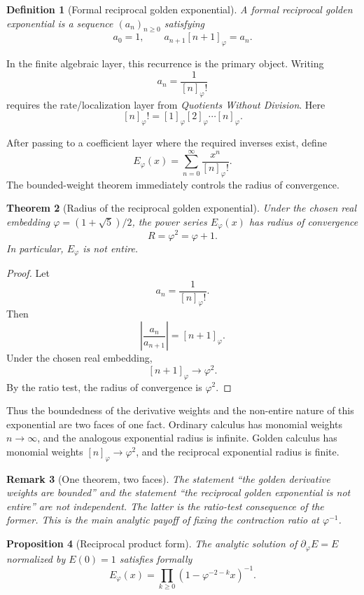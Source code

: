 \documentclass[11pt]{article}
\newtheorem{definition}{Definition}[section]
\newtheorem{theorem}[definition]{Theorem}
\newtheorem{proposition}[definition]{Proposition}
\newtheorem{remark}[definition]{Remark}
\newcommand{\ph}{\varphi}
\newcommand{\dd}{\partial_{\ph}}
\newcommand{\Eph}{E_{\ph}}
\begin{document}
\begin{definition}[Formal reciprocal golden exponential]
A formal reciprocal golden exponential is a sequence $(a_n)_{n\ge0}$ satisfying
\[
    a_{0}=1,
    \qquad
    a_{n+1}[n+1]_{\ph}=a_n.
\]
\end{definition}

In the finite algebraic layer, this recurrence is the primary object.  Writing
\[
    a_n=\frac{1}{[n]_{\ph}!}
\]
requires the rate/localization layer from \emph{Quotients Without Division}.  Here
\[
    [n]_{\ph}!=[1]_{\ph}[2]_{\ph}\cdots[n]_{\ph}.
\]

After passing to a coefficient layer where the required inverses exist, define
\[
    \Eph(x)=\sum_{n=0}^{\infty}\frac{x^n}{[n]_{\ph}!}.
\]
The bounded-weight theorem immediately controls the radius of convergence.

\begin{theorem}[Radius of the reciprocal golden exponential]
Under the chosen real embedding $\ph=(1+\sqrt5)/2$, the power series $\Eph(x)$ has radius of convergence
\[
    R=\ph^2=\ph+1.
\]
In particular, $\Eph$ is not entire.
\end{theorem}

\begin{proof}
Let
\[
    a_n=\frac{1}{[n]_{\ph}!}.
\]
Then
\[
    \left|\frac{a_n}{a_{n+1}}\right|=[n+1]_{\ph}.
\]
Under the chosen real embedding,
\[
    [n+1]_{\ph}\longrightarrow \ph^2.
\]
By the ratio test, the radius of convergence is $\ph^2$.
\end{proof}

Thus the boundedness of the derivative weights and the non-entire nature of this exponential are two faces of one fact.  Ordinary calculus has monomial weights $n\to\infty$, and the analogous exponential radius is infinite.  Golden calculus has monomial weights $[n]_{\ph}\to\ph^2$, and the reciprocal exponential radius is finite.

\begin{remark}[One theorem, two faces]
The statement ``the golden derivative weights are bounded'' and the statement ``the reciprocal golden exponential is not entire'' are not independent.  The latter is the ratio-test consequence of the former.  This is the main analytic payoff of fixing the contraction ratio at $\ph^{-1}$.
\end{remark}

\begin{proposition}[Reciprocal product form]
The analytic solution of $\dd E=E$ normalized by $E(0)=1$ satisfies formally
\[
    \Eph(x)=\prod_{k\ge0}(1-\ph^{-2-k}x)^{-1}.
\]
\end{proposition}
\end{document}
